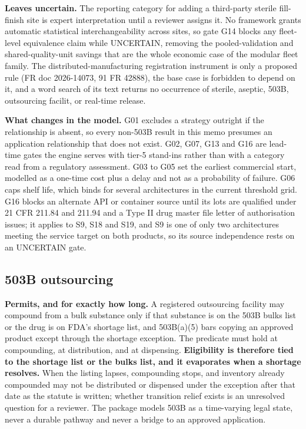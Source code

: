 \textbf{Leaves uncertain.} The reporting category for adding a third-party sterile fill-finish
site is expert interpretation until a reviewer assigns it. No framework grants automatic
statistical interchangeability across sites, so gate G14 blocks any fleet-level equivalence claim
while UNCERTAIN, removing the pooled-validation and shared-quality-unit savings that are the whole
economic case of the modular fleet family. The distributed-manufacturing registration instrument
is only a proposed rule (FR doc 2026-14073, 91 FR 42888), the base case is forbidden to depend on
it, and a word search of its text returns no occurrence of sterile, aseptic, 503B, outsourcing
facilit, or real-time release.

\textbf{What changes in the model.} G01 excludes a strategy outright if the relationship is
absent, so every non-503B result in this memo presumes an application relationship that does not
exist. G02, G07, G13 and G16 are lead-time gates the engine serves with tier-5 stand-ins rather
than with a category read from a regulatory assessment. G03 to G05 set the earliest commercial
start, modelled as a one-time cost plus a delay and not as a probability of failure. G06 caps
shelf life, which binds for several architectures in the current threshold grid. G16 blocks an
alternate API or container source until its lots are qualified under 21 CFR 211.84 and 211.94 and
a Type II drug master file letter of authorisation issues; it applies to S9, S18 and S19, and S9
is one of only two architectures meeting the service target on both products, so its source
independence rests on an UNCERTAIN gate.

\subsection{503B outsourcing}

\textbf{Permits, and for exactly how long.} A registered outsourcing facility may compound from a
bulk substance only if that substance is on the 503B bulks list or the drug is on FDA's shortage
list, and 503B(a)(5) bars copying an approved product except through the shortage exception. The
predicate must hold at compounding, at distribution, and at dispensing. \textbf{Eligibility is
therefore tied to the shortage list or the bulks list, and it evaporates when a shortage
resolves.} When the listing lapses, compounding stops, and inventory already compounded may not be
distributed or dispensed under the exception after that date as the statute is written; whether
transition relief exists is an unresolved question for a reviewer. The package models 503B as a
time-varying legal state, never a durable pathway and never a bridge to an approved application.

